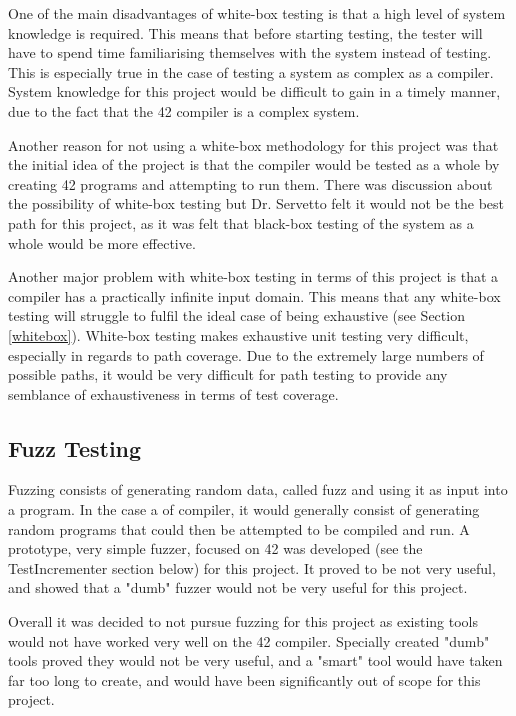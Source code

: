 One of the main disadvantages of white-box testing is that a high level of system knowledge is required. This means that before starting testing, the tester will have to spend time familiarising themselves with the system instead of testing. This is especially true in the case of testing a system as complex as a compiler. System knowledge for this project would be difficult to gain in a timely manner, due to the fact that the 42 compiler is a complex system.

Another reason for not using a white-box methodology for this project was that the initial idea of the project is that the compiler would be tested as a whole by creating 42 programs and attempting to run them. There was discussion about the possibility of white-box testing but Dr. Servetto felt it would not be the best path for this project, as it was felt that black-box testing of the system as a whole would be more effective.

Another major problem with white-box testing in terms of this project is that a compiler has a practically infinite input domain. This means that any white-box testing will struggle to fulfil the ideal case of being exhaustive (see Section \ref{whitebox}). White-box testing makes exhaustive unit testing very difficult, especially in regards to path coverage. Due to the extremely large numbers of possible paths, it would be very difficult for path testing to provide any semblance of exhaustiveness in terms of test coverage.

\subsection{Fuzz Testing}

Fuzzing consists of generating random data, called fuzz and using it as input into a program. In the case a of compiler, it would generally consist of generating random programs that could then be attempted to be compiled and run. A prototype, very simple fuzzer, focused on 42 was developed (see the TestIncrementer section below) for this project. It proved to be not very useful, and showed that a "dumb" fuzzer would not be very useful for this project.

Overall it was decided to not pursue fuzzing for this project as existing tools would not have worked very well on the 42 compiler. Specially created "dumb" tools proved they would not be very useful, and a "smart" tool would have taken far too long to create, and would have been significantly out of scope for this project.

